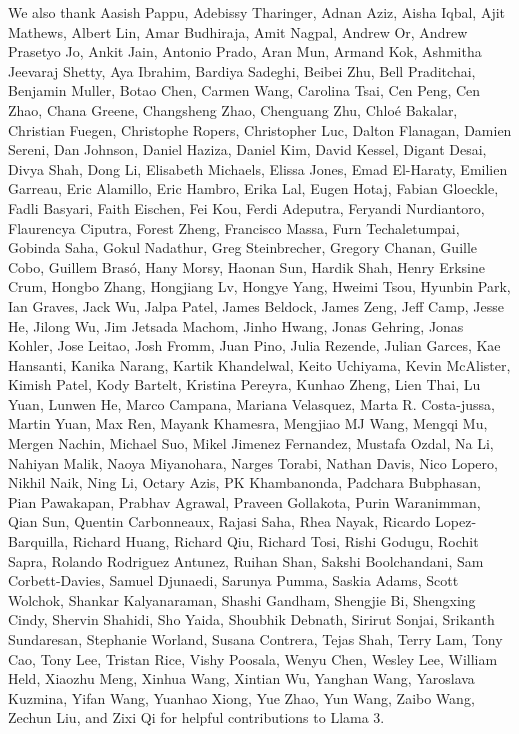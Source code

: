 We also thank Aasish Pappu, Adebissy Tharinger, Adnan Aziz, Aisha Iqbal, Ajit Mathews, Albert Lin, Amar Budhiraja, Amit Nagpal, Andrew Or, Andrew Prasetyo Jo, Ankit Jain, Antonio Prado, Aran Mun, Armand Kok, Ashmitha Jeevaraj Shetty, Aya Ibrahim, Bardiya Sadeghi, Beibei Zhu, Bell Praditchai, Benjamin Muller, Botao Chen, Carmen Wang, Carolina Tsai, Cen Peng, Cen Zhao, Chana Greene, Changsheng Zhao, Chenguang Zhu, Chloé Bakalar, Christian Fuegen, Christophe Ropers, Christopher Luc, Dalton Flanagan, Damien Sereni, Dan Johnson, Daniel Haziza, Daniel Kim, David Kessel, Digant Desai, Divya Shah, Dong Li, Elisabeth Michaels, Elissa Jones, Emad El-Haraty, Emilien Garreau, Eric Alamillo, Eric Hambro, Erika Lal, Eugen Hotaj, Fabian Gloeckle, Fadli Basyari, Faith Eischen, Fei Kou, Ferdi Adeputra, Feryandi Nurdiantoro, Flaurencya Ciputra, Forest Zheng, Francisco Massa, Furn Techaletumpai, Gobinda Saha, Gokul Nadathur, Greg Steinbrecher, Gregory Chanan, Guille Cobo, Guillem Brasó, Hany Morsy, Haonan Sun, Hardik Shah, Henry Erksine Crum, Hongbo Zhang, Hongjiang Lv, Hongye Yang, Hweimi Tsou, Hyunbin Park, Ian Graves, Jack Wu, Jalpa Patel, James Beldock, James Zeng, Jeff Camp, Jesse He, Jilong Wu, Jim Jetsada Machom, Jinho Hwang, Jonas Gehring, Jonas Kohler, Jose Leitao, Josh Fromm, Juan Pino, Julia Rezende, Julian Garces, Kae Hansanti, Kanika Narang, Kartik Khandelwal, Keito Uchiyama, Kevin McAlister, Kimish Patel, Kody Bartelt, Kristina Pereyra, Kunhao Zheng, Lien Thai, Lu Yuan, Lunwen He, Marco Campana, Mariana Velasquez, Marta R. Costa-jussa, Martin Yuan, Max Ren, Mayank Khamesra, Mengjiao MJ Wang, Mengqi Mu, Mergen Nachin, Michael Suo, Mikel Jimenez Fernandez, Mustafa Ozdal, Na Li, Nahiyan Malik, Naoya Miyanohara, Narges Torabi, Nathan Davis, Nico Lopero, Nikhil Naik, Ning Li, Octary Azis, PK Khambanonda, Padchara Bubphasan, Pian Pawakapan, Prabhav Agrawal, Praveen Gollakota, Purin Waranimman, Qian Sun, Quentin Carbonneaux, Rajasi Saha, Rhea Nayak, Ricardo Lopez-Barquilla, Richard Huang, Richard Qiu, Richard Tosi, Rishi Godugu, Rochit Sapra, Rolando Rodriguez Antunez, Ruihan Shan, Sakshi Boolchandani, Sam Corbett-Davies, Samuel Djunaedi, Sarunya Pumma, Saskia Adams, Scott Wolchok, Shankar Kalyanaraman, Shashi Gandham, Shengjie Bi, Shengxing Cindy, Shervin Shahidi, Sho Yaida, Shoubhik Debnath, Sirirut Sonjai, Srikanth Sundaresan, Stephanie Worland, Susana Contrera, Tejas Shah, Terry Lam, Tony Cao, Tony Lee, Tristan Rice, Vishy Poosala, Wenyu Chen, Wesley Lee, William Held, Xiaozhu Meng, Xinhua Wang, Xintian Wu, Yanghan Wang, Yaroslava Kuzmina, Yifan Wang, Yuanhao Xiong, Yue Zhao, Yun Wang, Zaibo Wang, Zechun Liu, and Zixi Qi for helpful contributions to Llama 3.
